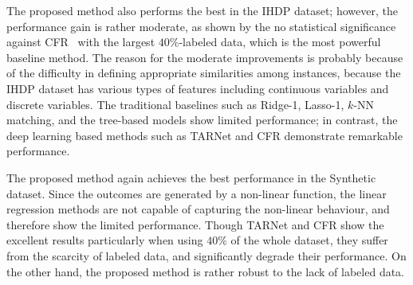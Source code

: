 The proposed method also performs the best in the IHDP dataset; however, the performance gain is rather moderate, as shown by the no statistical significance against CFR~\cite{shalit2017estimating} with the largest $40\%$-labeled data, which is the most powerful baseline method.
The reason for the moderate improvements is probably because of the difficulty in defining appropriate similarities among instances, because the IHDP dataset has various types of features including continuous variables and discrete variables.
The traditional baselines such as Ridge-1, Lasso-1, $k$-NN matching, and the tree-based models show limited performance;
in contrast, the deep learning based methods such as TARNet and CFR demonstrate remarkable performance. 

The proposed method again achieves the best performance in the Synthetic dataset. 
Since the outcomes are generated by a non-linear function, the linear regression methods are not capable of capturing the non-linear behaviour, and therefore show the limited performance. 
Though TARNet and CFR show the excellent results particularly when using $40$\% of the whole dataset, they suffer from the scarcity of labeled data, and significantly degrade their performance. 
On the other hand, the proposed method is rather robust to the lack of labeled data.



